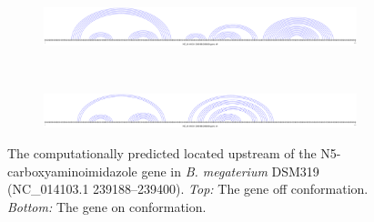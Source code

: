 \begin{figure}[!ht]
\centering
\begin{subfigure}[h]{\textwidth}
\centering
\includegraphics[width=.9\textwidth]{Figures/Ribofinder/NC_014103_1_239188_239400_OFF.pdf}
\end{subfigure} \\
\medskip
\begin{subfigure}[h]{\textwidth}
\centering
\includegraphics[width=.9\textwidth]{Figures/Ribofinder/NC_014103_1_239188_239400_ON.pdf}
\end{subfigure}
\caption{The computationally predicted \rb located upstream of the
N5-carboxyaminoimidazole
gene in {\em B. megaterium} DSM319 (NC\_014103.1 239188--239400).
{\em Top:} The gene off conformation. {\em Bottom:} The gene on conformation.}
\label{fig:figure:NC_014103_1_239188_239400}
\end{figure}
